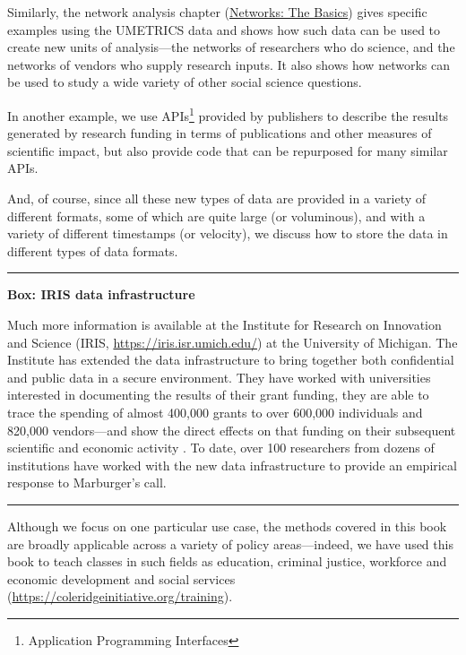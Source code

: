 \documentclass[]{krantz}
\begin{document}
Similarly, the network analysis chapter
(\protect\hyperlink{chap:networks}{Networks: The Basics}) gives specific
examples using the UMETRICS data and shows how such data can be used to
create new units of analysis---the networks of researchers who do
science, and the networks of vendors who supply research inputs. It also
shows how networks can be used to study a wide variety of other social
science questions.

In another example, we use APIs\footnote{Application Programming
  Interfaces} provided by publishers to describe the results generated
by research funding in terms of publications and other measures of
scientific impact, but also provide code that can be repurposed for many
similar APIs.

And, of course, since all these new types of data are provided in a
variety of different formats, some of which are quite large (or
voluminous), and with a variety of different timestamps (or velocity),
we discuss how to store the data in different types of data formats.

\begin{center}\rule{0.5\linewidth}{\linethickness}\end{center}

\textbf{Box: IRIS data infrastructure}

Much more information is available at the Institute for Research on
Innovation and Science (IRIS, \url{https://iris.isr.umich.edu/}) at the
University of Michigan. The Institute has extended the data
infrastructure to bring together both confidential and public data in a
secure environment. They have worked with universities interested in
documenting the results of their grant funding, they are able to trace
the spending of almost 400,000 grants to over 600,000 individuals and
820,000 vendors---and show the direct effects on that funding on their
subsequent scientific and economic activity
\citep{InstituteForResearchOnInnovationAndScienceIRISResearch2019}. To
date, over 100 researchers from dozens of institutions have worked with
the new data infrastructure to provide an empirical response to
Marburger's call.

\begin{center}\rule{0.5\linewidth}{\linethickness}\end{center}

Although we focus on one particular use case, the methods covered in
this book are broadly applicable across a variety of policy
areas---indeed, we have used this book to teach classes in such fields
as education, criminal justice, workforce and economic development and
social services (\url{https://coleridgeinitiative.org/training}).
\end{document}
